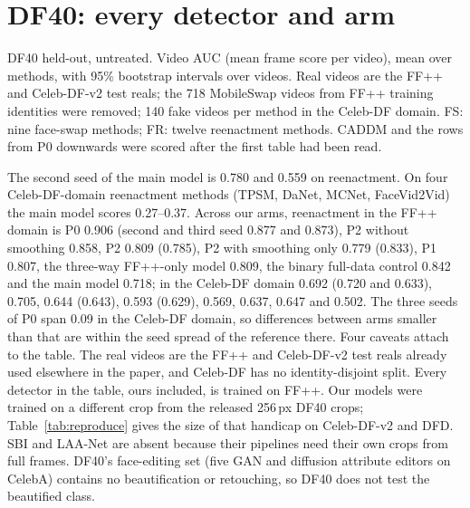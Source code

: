 \documentclass[10pt]{article}
\begin{document}
\section{DF40: every detector and arm}
\begin{table}[H]
\centering
\caption{DF40 held-out, untreated. Video AUC (mean frame score per video), mean over methods, with 95\% bootstrap
intervals over videos. Real videos are the FF++ and Celeb-DF-v2 test reals; the 718 MobileSwap videos from FF++
training identities were removed; 140 fake videos per method in the Celeb-DF domain. FS: nine face-swap methods; FR:
twelve reenactment methods. CADDM and the rows from P0 downwards were scored after the first table had been read.}
\label{tab:v4df40full}
\scriptsize
\begin{adjustbox}{max width=\linewidth}\end{adjustbox}
\end{table}
The second seed of the main model is 0.780 and 0.559 on reenactment. On four Celeb-DF-domain reenactment methods (TPSM,
DaNet, MCNet, FaceVid2Vid) the main model scores 0.27--0.37. Across our arms, reenactment in the FF++ domain is P0 0.906
(second and third seed 0.877 and 0.873), P2 without smoothing 0.858, P2 0.809 (0.785), P2 with smoothing only 0.779
(0.833), P1 0.807, the three-way FF++-only model 0.809, the binary full-data control 0.842 and the main model 0.718;
in the Celeb-DF domain 0.692 (0.720 and 0.633), 0.705, 0.644 (0.643), 0.593 (0.629), 0.569, 0.637, 0.647 and 0.502. The
three seeds of P0 span 0.09 in the Celeb-DF domain, so differences between arms smaller than that are within the seed
spread of the reference there. Four caveats attach to the table. The real videos are the FF++ and Celeb-DF-v2 test
reals already used elsewhere in the paper, and Celeb-DF has no identity-disjoint split. Every detector in the table,
ours included, is trained on FF++. Our models were trained on a different crop from the released 256\,px DF40 crops;
Table~\ref{tab:reproduce} gives the size of that handicap on Celeb-DF-v2 and DFD. SBI and LAA-Net are absent because
their pipelines need their own crops from full frames. DF40's face-editing set (five GAN and diffusion attribute
editors on CelebA) contains no beautification or retouching, so DF40 does not test the beautified class.
\end{document}
